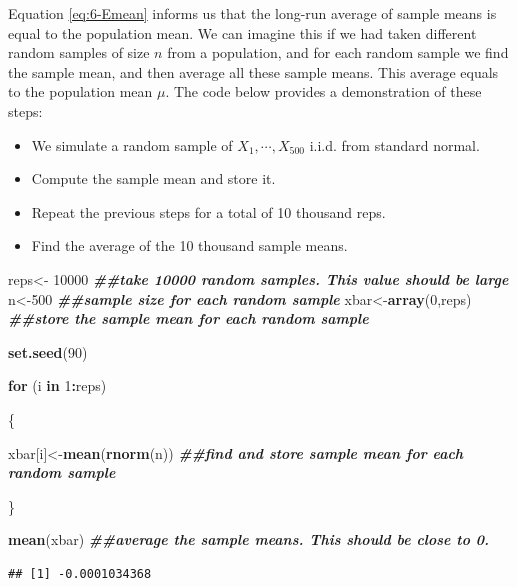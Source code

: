 \documentclass[
]{book}
\newenvironment{Shaded}{\begin{snugshade}}{\end{snugshade}}
\newcommand{\ControlFlowTok}[1]{\textcolor[rgb]{0.13,0.29,0.53}{\textbf{#1}}}
\newcommand{\DecValTok}[1]{\textcolor[rgb]{0.00,0.00,0.81}{#1}}
\newcommand{\DocumentationTok}[1]{\textcolor[rgb]{0.56,0.35,0.01}{\textbf{\textit{#1}}}}
\newcommand{\FunctionTok}[1]{\textcolor[rgb]{0.13,0.29,0.53}{\textbf{#1}}}
\newcommand{\NormalTok}[1]{#1}
\newcommand{\OtherTok}[1]{\textcolor[rgb]{0.56,0.35,0.01}{#1}}
\newcommand{\SpecialCharTok}[1]{\textcolor[rgb]{0.81,0.36,0.00}{\textbf{#1}}}
\providecommand{\tightlist}{%
  \setlength{\itemsep}{0pt}\setlength{\parskip}{0pt}}
\begin{document}
Equation \eqref{eq:6-Emean} informs us that the long-run average of sample means is equal to the population mean. We can imagine this if we had taken different random samples of size \(n\) from a population, and for each random sample we find the sample mean, and then average all these sample means. This average equals to the population mean \(\mu\). The code below provides a demonstration of these steps:

\begin{itemize}
\tightlist
\item
  We simulate a random sample of \(X_1, \cdots, X_{500}\) i.i.d. from standard normal.
\item
  Compute the sample mean and store it.
\item
  Repeat the previous steps for a total of 10 thousand reps.
\item
  Find the average of the 10 thousand sample means.
\end{itemize}

\begin{Shaded}
\begin{Highlighting}[]
\NormalTok{reps}\OtherTok{\textless{}{-}} \DecValTok{10000} \DocumentationTok{\#\#take 10000 random samples. This value should be large}
\NormalTok{n}\OtherTok{\textless{}{-}}\DecValTok{500} \DocumentationTok{\#\#sample size for each random sample}
\NormalTok{xbar}\OtherTok{\textless{}{-}}\FunctionTok{array}\NormalTok{(}\DecValTok{0}\NormalTok{,reps) }\DocumentationTok{\#\#store the sample mean for each random sample}

\FunctionTok{set.seed}\NormalTok{(}\DecValTok{90}\NormalTok{)}

\ControlFlowTok{for}\NormalTok{ (i }\ControlFlowTok{in} \DecValTok{1}\SpecialCharTok{:}\NormalTok{reps)}
  
\NormalTok{\{}
  
\NormalTok{  xbar[i]}\OtherTok{\textless{}{-}}\FunctionTok{mean}\NormalTok{(}\FunctionTok{rnorm}\NormalTok{(n)) }\DocumentationTok{\#\#find and store sample mean for each random sample}
  
\NormalTok{\}}

\FunctionTok{mean}\NormalTok{(xbar) }\DocumentationTok{\#\#average the sample means. This should be close to 0. }
\end{Highlighting}
\end{Shaded}

\begin{verbatim}
## [1] -0.0001034368
\end{verbatim}
\end{document}
